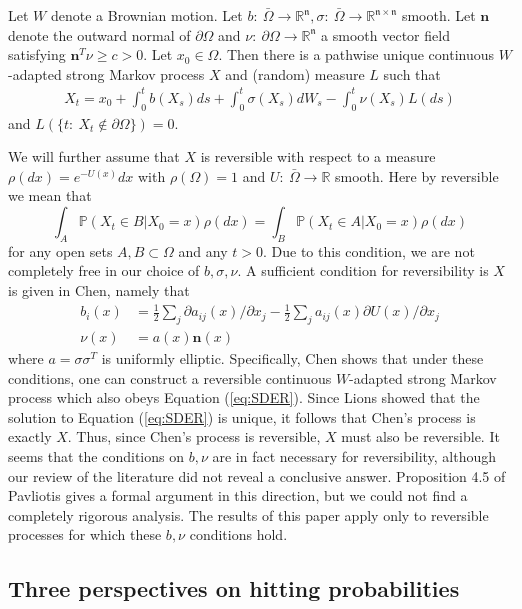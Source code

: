 \documentclass[english, aip, jcp, priprint, graphicx,floatfix]{revtex4-1}
\theoremstyle{plain}
\theoremstyle{definition}
\theoremstyle{plain}
\newcommand{\dimension}{{\mathfrak{n}}}
\begin{document}
Let $W$ denote a Brownian motion.  Let $b:\ \bar \Omega \rightarrow \mathbb{R}^\dimension,\sigma:\ \bar \Omega \rightarrow \mathbb{R}^{\dimension\times\dimension}$ smooth.  Let $\mathbf{n}$ denote the outward normal of $\partial \Omega$ and $\nu:\ \partial \Omega \rightarrow \mathbb{R}^\dimension$ a smooth vector field satisfying $\mathbf{n}^T\nu\geq c>0$. Let $x_0 \in \Omega$.  Then there is a pathwise unique continuous $W$-adapted strong Markov process $X$ and (random) measure $L$ such that 
\begin{gather}\label{eq:SDER}
X_t = x_0 + \int_0^t b(X_s)ds + \int_0^t \sigma(X_s)dW_s - \int_0^t \nu(X_s) L(ds)
\end{gather}
and $L(\{t:\ X_t \notin \partial \Omega\})=0$.\cite{lions1984stochastic} 

We will further assume that $X$ is reversible with respect to a measure $\rho(dx)=e^{-U(x)}dx$ with $\rho(\Omega)=1$ and $U:\ \bar \Omega \rightarrow \mathbb{R}$ smooth.  Here by reversible we mean that
\[
\int_{A}\mathbb{P}(X_{t}\in B|X_{0}=x)\rho(dx)  =\int_{B}\mathbb{P}(X_{t}\in A|X_{0}=x)\rho(dx)
\]
for any open sets $A,B\subset \Omega$ and any $t>0$.  Due to this condition, we are not completely free in our choice of $b,\sigma,\nu$.  A sufficient condition for reversibility is $X$ is given in Chen,\cite{chen1993reflecting} namely that
\begin{align*}
b_i(x)&=\frac{1}{2} \sum_j \partial a_{ij}(x)/\partial x_j - \frac{1}{2}\sum_j a_{ij}(x) \partial U(x)/\partial x_j \\
\nu(x)&= a(x) \mathbf{n}(x)
\end{align*}
where $a=\sigma\sigma^T$ is uniformly elliptic.  Specifically, Chen shows that under these conditions, one can construct a reversible continuous $W$-adapted strong Markov process which also obeys Equation (\ref{eq:SDER}).  Since Lions\cite{lions1984stochastic} showed that the solution to Equation (\ref{eq:SDER}) is unique, it follows that Chen's process is exactly $X$.  Thus, since Chen's process is reversible, $X$ must also be reversible.  It seems that the conditions on $b,\nu$ are in fact necessary for reversibility, although our review of the literature did not reveal a conclusive answer.  Proposition 4.5 of Pavliotis\cite{Pavliotis2016-xn} gives a formal argument in this direction, but we could not find a completely rigorous analysis.  The results of this paper apply only to reversible processes for which these $b,\nu$ conditions hold.

\subsection{Three perspectives on hitting probabilities}
\end{document}
